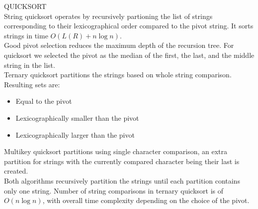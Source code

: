 {\sffamily\normalsize{\color{sciorange} QUICKSORT}}\vspace{1mm}\\
\footnotesize 
String quicksort operates by recursively partioning the list of strings corresponding to their lexicographical order compared to the pivot string. It sorts strings in time $O(L(R) + n \log n)$.\\ 

Good pivot selection reduces the maximum depth of the recursion tree. For quicksort we selected the pivot as the median of the first, the last, and the middle string in the list.\\

Ternary quicksort partitions the strings based on whole string comparison. Resulting sets are:
    
\begin{itemize}
    \item Equal to the pivot\vspace{-1mm}
    \item Lexicographically smaller than the pivot\vspace{-1mm}
    \item Lexicographically larger than the pivot
\end{itemize}

Multikey quicksort partitions using single character comparison, an extra partition for strings with the currently compared character being their last is created.\\
Both algorithms recursively partition the strings until each partition contains only one string.  Number of string comparisons in ternary quicksort is of $O(n \log n)$, with overall time complexity depending on the choice of the pivot.




